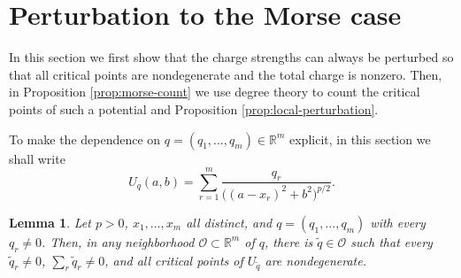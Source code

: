 \documentclass[leqno,11pt]{amsart}
\numberwithin{equation}{section}
\newcommand{\bbR}{\mathbb{R}}
\newtheorem{lemma}{Lemma}
\theoremstyle{definition}
\begin{document}
	\section{Perturbation to the Morse case}\label{sec:morse}
	
	In this section we first show that the charge strengths can always be perturbed so that all critical points are nondegenerate and the total charge is nonzero. Then, in Proposition \ref{prop:morse-count} we use degree theory to count the critical points of such a potential and Proposition \ref{prop:local-perturbation}. 
	
	To make the dependence on $q=(q_1,\ldots,q_m)\in\bbR^m$ explicit, in this section we shall write
	\begin{equation}\label{eq:Uq}
		U_q(a,b)=\sum_{r=1}^m \frac{q_r}{\big((a-x_r)^2+b^2\big)^{p/2}}.
	\end{equation}
	
	\begin{lemma}\label{lem:generic-morse}
		Let $p>0$, $x_1,\ldots,x_m$ all distinct, and $q=(q_1,\ldots,q_m)$ with every $q_r\neq0$. Then, in any neighborhood $\mathcal O \subset \bbR^m$ of $q$, there is $\widetilde q\in\mathcal O$ such that every $\widetilde q_r \neq 0$, $\sum_r\widetilde q_r\neq0$, and all critical points of $U_{\widetilde q}$ are nondegenerate.
	\end{lemma}
	
\end{document}
